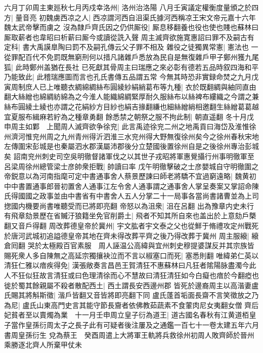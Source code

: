 六月丁卯周主東廵秋七月丙戍幸洛州|{
	洛州治洛陽}
八月壬寅議定權衡度量頒之於四方|{
	量音亮}
初魏虜西凉之人|{
	西凉謂河西自沮渠氏據河西稱凉王宋文帝元嘉十六年魏太武帝擊而虜之}
沒為隸戶齊氏因之仍供厮役|{
	厮息移翻養也役也使也賤也蘇林曰厮取薪者也韋昭曰析薪曰厮今或讀從詵入聲}
周主滅齊欲施寛惠詔曰罪不及嗣古有定科|{
	書大禹謨臯陶曰罰不及嗣孔傳云父子罪不相及}
雜役之徒獨異常憲|{
	憲法也}
一從罪配百代不免罰既無窮刑何以措凡諸雜戶悉放為民自是無復雜戶甲子鄭州獲九尾狐|{
	此時鄭州盖猶在長社}
已死獻其骨周主曰瑞應之來必彰有德若五品時叙四海和平乃能致此|{
	此稽瑞應圖而言也孔氏書傳五品謂五常}
今無其時恐非實録命焚之九月戊寅周制庶人已上唯聽衣綢綿綢絲布圓綾紗絹綃葛布等九種|{
	衣於既翻綢與紬同直由翻大絲繒也綿綢紡綿為之今淮人能織綿綢緊厚耐久服絲布以絲裨布縷織之今謂之兼絲布圓綾土綾也亦謂之花絹紗方目紗也絹吉掾翻縑也細絲繒綃相邀翻生絲繒葛葛越宜夏服布緝麻若紵為之種章勇翻}
餘悉禁之朝祭之服不拘此制|{
	朝直遥翻}
冬十月戊申周主如鄴　上聞周人滅齊欲争徐兖|{
	此言禹迹徐兖二州之地禹貢曰海岱及淮惟徐州濟河惟兖州周之九州青州得沂泗淮三水兖州得大野無復徐州矣今之徐州春秋宋地左傳圍宋彭城是也秦屬泗水郡漢屬沛郡後分立楚國後置徐州自是之後徐州專治彭城矣}
詔南兖州刺史司空吳明徹督諸軍伐之以其世子戎昭將軍惠覺攝行州事明徹軍至呂梁周徐州總管梁士彦帥衆拒戰|{
	帥讀曰率}
戊午明徹擊破之士彦嬰城自守明徹圍之帝鋭意以為河南指麾可定中書通事舍人蔡景歷諫曰師老將驕不宜過窮遠略|{
	魏黄初中中書置通事郎晉初置舍人通事江左令舍人通事謂之通事舍人掌呈奏案又掌詔命陳氏得國國之政事並由中書省有中書舍人五人分掌二十一局事各當尚書諸曹並為上司揔國内機要尚書唯聽受而已將即亮翻}
帝怒以為沮衆|{
	沮在呂翻}
出為豫章内史未行有飛章劾景歷在省贓汙狼籍坐免官削爵土|{
	飛者不知其所自來也盖出於上意劾戶槩翻又音戶得翻}
周改葬德皇帝於冀州|{
	宇文肱者宇文泰之父也從鮮于脩禮攻定州戰死於唐河武城初追謚德皇帝其地在齊未得改葬平齊之後乃得改葬于冀州}
周主服縗|{
	縗倉囘翻}
哭於太極殿百官素服　周人誣温公高緯與宜州刺史穆提婆謀反并其宗族皆賜死衆人多自陳無之高延宗獨攘袂泣而不言以椒塞口而死|{
	塞悉則翻}
唯緯弟仁英以清狂仁雅以瘖疾得免|{
	漢張敞奏言昌邑王賀清狂不惠蘇林曰凡狂者隂陽脉盡濁今此人不狂似狂故言清狂或曰色理清徐而心不慧故曰清狂清狂如今白癡也瘖於今翻瘂也}
徙於蜀其餘親屬不殺者散配西土|{
	西土謂長安西邊州郡}
皆死於邊裔周主以高湝妻盧氏賜其將斛斯徵|{
	湝戶皆翻又音皆將即亮翻下同}
盧氏蓬首垢面長齋不言笑徵放之乃為尼|{
	盧氏山東高門史言其能守節長齎者依佛教茹蔬素不食葷肉尼女夷翻女僧}
齊后妃貧者至以賣燭為業　十一月壬申周立皇子衍為道王|{
	道古國名春秋有江黄道栢皇子當作皇孫衍周太子之長子此有可疑者後注屢及之通鑑一百七十一卷太建五年六月書周皇孫衍生}
兌為蔡王　癸酉周遣上大將軍王軌將兵救徐州初周人敗齊師於晉州乘勝逐北齊人所棄甲仗未


